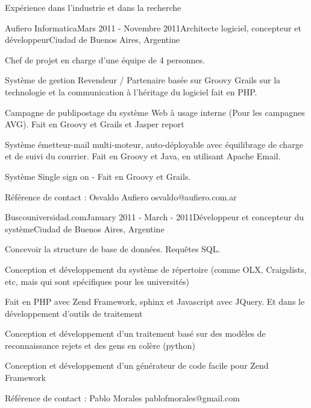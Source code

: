 \documentclass{resume} %
\begin{document}
\begin{rSection}{Exp\'{e}rience dans l'industrie et dans la recherche}
\begin{rSubsection}{Aufiero Informatica}{Mars 2011 - Novembre 2011}{Architecte logiciel, concepteur et d\'{e}veloppeur}{Ciudad de Buenos Aires, Argentine}
	\item Chef de projet en charge d'une \'{e}quipe de 4 personnes.
	\item Syst\`{e}me de gestion Revendeur / Partenaire bas\'{e}e sur Groovy Grails sur la technologie et la communication \`{a} l'h\'{e}ritage du logiciel fait en PHP.
	\item Campagne de publipostage du syst\`{e}me Web \`{a} usage interne (Pour les campagnes AVG). Fait en Groovy et Grails et Jasper report
	\item Syst\`{e}me \'{e}metteur-mail multi-moteur, auto-d\'{e}ployable avec \'{e}quilibrage de charge et de suivi du courrier. Fait en Groovy et Java, en utilisant Apache Email.
	\item Syst\`{e}me Single sign on -  Fait en Groovy et Grails.
	\item R\'{e}f\'{e}rence de contact : Osvaldo Aufiero osvaldo@aufiero.com.ar
\end{rSubsection}


\begin{rSubsection}{Buscouniversidad.com}{January 2011 -  March - 2011}{D\'{e}veloppeur et concepteur du syst\`{e}me}{Ciudad de Buenos Aires, Argentine}
	\item Concevoir la structure de base de donn\'{e}es. Requ\^etes SQL.
	\item Conception et d\'{e}veloppement du syst\`{e}me de r\'{e}pertoire (comme OLX, Craigslists, etc, mais qui sont sp\'{e}cifiques pour les universit\'{e}s)
	\item Fait en PHP avec Zend Framework, sphinx et Javascript avec JQuery. Et dans le d\'{e}veloppement d'outils de traitement
	\item Conception et d\'{e}veloppement d'un traitement bas\'{e} sur des mod\`{e}les de reconnaissance rejets et des gens en col\`{e}re (python)
	\item Conception et d\'{e}veloppement d'un g\'{e}n\'{e}rateur de code facile pour Zend Framework
	\item R\'{e}f\'{e}rence de contact : Pablo Morales pablofmorales@gmail.com
\end{rSubsection}


\end{rSection}
\end{document}
